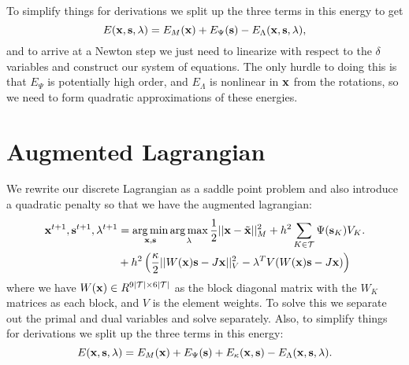 To simplify things for derivations we split up the three terms in this energy to get
\begin{equation}
E(\mathbf{x}, \mathbf{s}, \mathbf{\lambda}) = E_M (\mathbf{x}) + E_\Psi (\mathbf{s}) - E_\Lambda (\mathbf{x}, \mathbf{s}, \mathbf{\lambda}),
\end{equation}
and to arrive at a Newton step we just need to linearize with respect to the $\delta$ variables and construct our system of equations. The only hurdle to doing this is that $E_\Psi$ is potentially high order, and $E_\Lambda$ is nonlinear in $\mathbf{x}$ from the rotations, so we need to form quadratic approximations of these energies. 


\section{Augmented Lagrangian}
We rewrite our discrete Lagrangian as a saddle point problem and also introduce a quadratic penalty so that we have the augmented lagrangian:
\begin{equation}
\begin{split}
\mathbf{x}^{t+1}, \mathbf{s}^{t+1}, \mathbf{\lambda}^{t+1} &= \operatorname*{arg\,min}_{\mathbf{x},\mathbf{s}} \operatorname*{arg\,max}_{\mathbf{\lambda}}  \frac{1}{2}||\mathbf{x} - \tilde{\mathbf{x}}||_M^2 
+ h^2 \sum_{K \in \mathcal{T}} \Psi(\mathbf{s}_K) V_K.\\
&+ h^2 \left( \frac{\kappa}{2} ||W(\mathbf{x}) \mathbf{s} - J \mathbf{x}||_V^2 - \mathbf{\lambda}^T V (W(\mathbf{x}) \mathbf{s} - J \mathbf{x}) \right) \\
\end{split}
\end{equation}
where we have $W(\mathbf{x}) \in R^{9|\mathcal{T}| \times 6|\mathcal{T}|}$ as the block diagonal matrix with the $W_K$ matrices as each block, and $V$ is the element weights. To solve this we separate out the primal and dual variables and solve separately. Also, to simplify things for derivations we split up the three terms in this energy:
\begin{equation}
E(\mathbf{x}, \mathbf{s}, \mathbf{\lambda}) = E_M (\mathbf{x}) + E_\Psi (\mathbf{s}) + E_\kappa(\mathbf{x}, \mathbf{s}) - E_\Lambda (\mathbf{x}, \mathbf{s}, \mathbf{\lambda}).
\end{equation}
